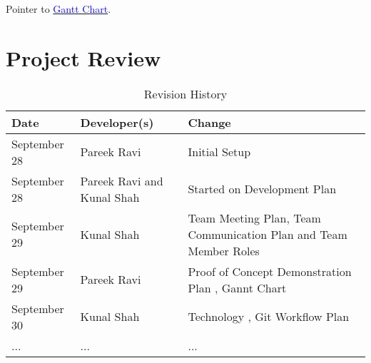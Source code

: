 \documentclass{article}
\begin{document}
Pointer to \href{run:Gantt Chart.gan}{\textcolor{blue}{Gantt Chart}}.

\section{Project Review}

\newpage

\begin{table}[hp]
\caption{Revision History} \label{TblRevisionHistory}
\begin{tabularx}{\textwidth}{llX}
\toprule
\textbf{Date} & \textbf{Developer(s)} & \textbf{Change}\\
\midrule
September 28 & Pareek Ravi & Initial Setup\\
September 28 & Pareek Ravi and Kunal Shah & Started on Development Plan\\
September 29 & Kunal Shah & Team Meeting Plan, Team Communication Plan and Team Member Roles\\
September 29 & Pareek Ravi & Proof of Concept Demonstration Plan , Gannt Chart\\
September 30 & Kunal Shah & Technology , Git Workflow Plan \\
... & ... & ...\\
\bottomrule
\end{tabularx}
\end{table}
\end{document}

